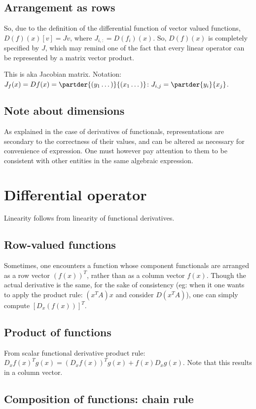 \documentclass[oneside, article]{memoir}
\begin{document}
\subsection{Arrangement as rows}
So, due to the definition of the differential function of vector valued functions, $D(f)(x)[v] = Jv$, where $J_{i, :} = D(f_i)(x)$. So, $D(f)(x)$ is completely specified by $J$, which may remind one of the fact that every linear operator can be represented by a matrix vector product.

This is aka Jacobian matrix. Notation: $J_f(x) = Df(x) = \partder{(y_{1} \dots)}{(x_{1} \dots)}$: $J_{i,j} = \partder{y_{i}}{x_{j}}$.

\subsection{Note about dimensions}
As explained in the case of derivatives of functionals, representations are secondary to the correctness of their values, and can be altered as necessary for convenience of expression. One must however pay attention to them to be consistent with other entities in the same algebraic expression.

\section{Differential operator}
Linearity follows from linearity of functional derivatives.

\subsection{Row-valued functions}
Sometimes, one encounters a function whose component functionals are arranged as a row vector $(f(x))^{T}$, rather than as a column vector $f(x)$. Though the actual derivative is the same, for the sake of consistency (eg: when it one wants to apply the product rule: $(x^{T}A)x$ and consider $D(x^{T}A)$), one can simply compute $[D_x(f(x))]^{T}$.

\subsection{Product of functions}
From scalar functional derivative product rule: $D_x f(x)^{T}g(x) = (D_x f(x))^{T} g(x) + f(x)D_x g(x)$. Note that this results in a column vector.

\subsection{Composition of functions: chain rule}
\end{document}
